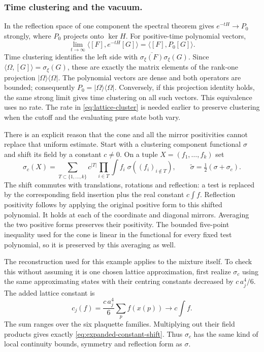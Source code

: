 \documentclass[11pt,letterpaper,reqno]{amsart}
\theoremstyle{definition}
\theoremstyle{remark}
\begin{document}
\subsubsection*{Time clustering and the vacuum.}
In the reflection space of one component the spectral theorem gives
$e^{-tH}\to P_0$ strongly, where $P_0$ projects onto $\ker H$.
For positive-time polynomial vectors,
\[
 \lim_{t\to\infty}\langle[F],e^{-tH}[G]\rangle
       =\langle[F],P_0[G]\rangle.
\]
Time clustering identifies the left side with
$\overline{\sigma_\xi(F)}\sigma_\xi(G)$.
Since $\langle\Omega,[G]\rangle=\sigma_\xi(G)$, these are exactly
the matrix elements of the rank-one projection
$|\Omega\rangle\langle\Omega|$. The polynomial vectors are dense
and both operators are bounded; consequently
$P_0=|\Omega\rangle\langle\Omega|$. Conversely, if this projection
identity holds, the same strong limit gives time clustering on all
such vectors. This equivalence uses no rate. The rate in
\eqref{eq:lattice-cluster} is needed earlier to preserve clustering
when the cutoff and the evaluating pure state both vary.

There is an explicit reason that the cone and all the mirror
positivities cannot replace that uniform estimate. Start with a
clustering component functional $\sigma$ and shift its field by a
constant $c\ne0$. On a tuple $X=(f_1,\ldots,f_k)$ set
\begin{equation}\label{eq:expanded-constant-shift}
 \sigma_c(X)=\sum_{T\subset\{1,\ldots,k\}}
       c^{|T|}\prod_{i\in T}\int f_i\;
       \sigma((f_i)_{i\notin T}),
 \qquad \widetilde\sigma=\tfrac12(\sigma+\sigma_c).
\end{equation}
The shift commutes with translations, rotations and reflection: a
test is replaced by the corresponding field insertion plus the real
constant $c\int f$. Reflection positivity follows by applying the
original positive form to this shifted polynomial. It holds at each
of the coordinate and diagonal mirrors. Averaging the two positive
forms preserves their positivity. The bounded five-point inequality
used for the cone is linear in the functional for every fixed test
polynomial, so it is preserved by this averaging as well.

The reconstruction used for this example applies to the
mixture itself. To check this without assuming it is
one chosen lattice approximation, first realize
\(\sigma_c\) using the same approximating states
with their centring constants decreased by
\(c\,a_j^4/6\). The added lattice constant is
\[
 c_j(f)=\frac{c\,a_j^4}{6}\sum_p f(x(p))
                              \longrightarrow c\int f.
\]
The sum ranges over the six plaquette families.
Multiplying out their field products gives exactly
\eqref{eq:expanded-constant-shift}. Thus \(\sigma_c\)
has the same kind of local continuity bounds,
symmetry and reflection form as \(\sigma\).
\end{document}
